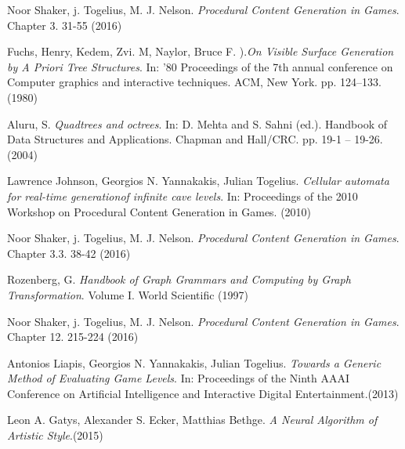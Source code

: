 \begin{thebibliography}{9}
 Noor Shaker, j. Togelius, M. J. Nelson. \textit{Procedural Content Generation in Games}. Chapter 3. 31-55 (2016)

 Fuchs, Henry, Kedem, Zvi. M, Naylor, Bruce F. ).\textit{On Visible Surface Generation by A Priori Tree Structures}. In: '80 Proceedings of the 7th annual conference on Computer graphics and interactive techniques. ACM, New York. pp. 124–133. (1980)

 Aluru, S. \textit{Quadtrees and octrees}. In: D. Mehta and S. Sahni (ed.). Handbook of Data Structures and Applications. Chapman and Hall/CRC. pp. 19-1 -- 19-26. (2004)


 Lawrence Johnson, Georgios N. Yannakakis, Julian Togelius. \textit{Cellular automata for real-time generationof infinite cave levels}. In: Proceedings of the 2010 Workshop on Procedural Content Generation in Games. (2010)


 Noor Shaker, j. Togelius, M. J. Nelson. \textit{Procedural Content Generation in Games}. Chapter 3.3. 38-42 (2016)

 Rozenberg, G. \textit{Handbook of Graph Grammars and Computing by Graph Transformation}. Volume I. World Scientific (1997)


 Noor Shaker, j. Togelius, M. J. Nelson. \textit{Procedural Content Generation in Games}. Chapter 12. 215-224 (2016)

 Antonios Liapis, Georgios N. Yannakakis, Julian Togelius. \textit{Towards a Generic Method of Evaluating Game Levels}. In:  Proceedings of the Ninth AAAI Conference on Artificial Intelligence and Interactive Digital Entertainment.(2013)

 Leon A. Gatys, Alexander S. Ecker, Matthias Bethge. \textit{A Neural Algorithm of Artistic Style}.(2015)



\end{thebibliography}